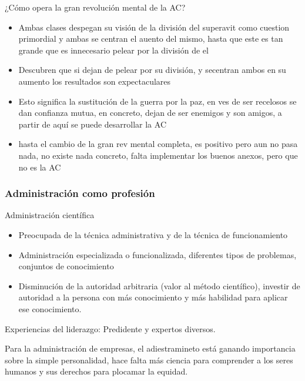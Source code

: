 ¿Cómo opera la gran revolución mental de la AC?
\begin{itemize}
    \item Ambas clases despegan su visión de la división del superavit como cuestion primordial y ambas se centran el auento del mismo, hasta que este es tan grande que es innecesario pelear por la división de el
    \item Descubren que si dejan de pelear por su división, y secentran ambos en su aumento los resultados son expectaculares
    \item Esto significa la sustitución de la guerra por la paz, en ves de ser recelosos se dan confianza mutua, en concreto, dejan de ser enemigos y son amigos, a partir de aquí se puede desarrollar la AC
    \item hasta el cambio de la gran rev mental completa, es positivo pero aun no pasa nada, no existe nada concreto, falta implementar los buenos anexos, pero que no es la AC
\end{itemize}

\subsubsection{Administración como profesión}
Administración científica
\begin{itemize}
    \item Preocupada de la técnica administrativa y de la técnica de funcionamiento
    \item Administración especializada o funcionalizada, diferentes tipos de problemas, conjuntos de conocimiento
    \item Disminución de la autoridad arbitraria (valor al método científico), investir de autoridad a la persona con más conocimiento y más habilidad para aplicar ese conocimiento.
\end{itemize}
Experiencias del liderazgo: Predidente y expertos diversos.

Para la administración de empresas, el adiestramineto está ganando importancia sobre la simple personalidad, hace falta más ciencia para comprender a los seres humanos y sus derechos para plocamar la equidad.

